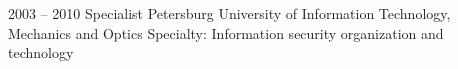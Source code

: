 


\begin{entrylist}
    \entry
    {2003 -- 2010}
    {Specialist}
    {Petersburg University of Information Technology, Mechanics and Optics}
    {Specialty: Information security organization and technology}
\end{entrylist}
